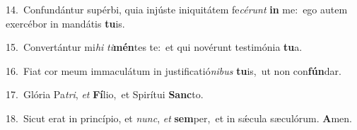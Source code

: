 {\numbfont\textcolor{\numbcolor}{14.}}~Confundántur supérbi, quia injúste iniquitátem fe\-\textit{cé}\-\textit{runt} \textbf{in} me:~\star ego autem exercébor in mandátis \textbf{tu}\-is.\par
{\numbfont\textcolor{\numbcolor}{15.}}~Convertántur mi\textit{hi} \textit{ti}\-\textbf{mén}tes te:~\star et qui novérunt testimónia \textbf{tu}\-a.\par
{\numbfont\textcolor{\numbcolor}{16.}}~Fiat cor meum immaculátum in justificatió\-\textit{ni}\-\textit{bus} \textbf{tu}\-is,~\star ut non con\-\textbf{fún}\-dar.\par
{\numbfont\textcolor{\numbcolor}{17.}}~Glória Pa\-\textit{tri}\-, \textit{et} \textbf{Fí}\-lio,~\star et Spirítui \textbf{Sanc}\-to.\par
{\numbfont\textcolor{\numbcolor}{18.}}~Sicut erat in princípio, et \textit{nunc}\-, \textit{et} \textbf{sem}\-per,~\star et in sǽcula sæculórum. \textbf{A}\-men.\par
